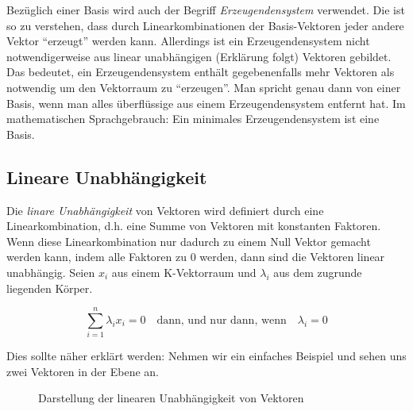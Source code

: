 Bezüglich einer Basis wird auch der Begriff \emph{Erzeugendensystem} verwendet. Die ist so zu verstehen, dass durch Linearkombinationen der Basis-Vektoren jeder andere Vektor "`erzeugt"' werden kann. Allerdings ist ein Erzeugendensystem nicht notwendigerweise aus linear unabhängigen (Erklärung folgt) Vektoren gebildet. Das bedeutet, ein Erzeugendensystem enthält gegebenenfalls mehr Vektoren als notwendig um den Vektorraum zu "`erzeugen"'. Man spricht genau dann von einer Basis, wenn man alles überflüssige aus einem Erzeugendensystem entfernt hat. Im mathematischen Sprachgebrauch: Ein minimales Erzeugendensystem ist eine Basis.

\subsection{Lineare Unabhängigkeit}

\begin{definition}
Die \emph{linare Unabhängigkeit}  von Vektoren wird definiert durch eine Linearkombination, d.h. eine Summe von Vektoren mit konstanten Faktoren. Wenn diese Linearkombination nur dadurch zu einem Null Vektor gemacht werden kann, indem alle Faktoren zu 0 werden, dann sind die Vektoren linear unabhängig. Seien $x_i$ aus einem K-Vektorraum und $\lambda_i $ aus dem zugrunde liegenden Körper. 

\begin{equation}\label{eq:linunabh}
\sum_{i=1}^{n} \lambda_i x_i = 0 \quad \text{dann, und nur dann, wenn} \quad \lambda_i = 0
\end{equation}
\end{definition}

Dies sollte näher erklärt werden: Nehmen wir ein einfaches Beispiel und sehen uns zwei Vektoren in der Ebene an. 

\bigskip

\begin{figure}
\begin{center}
\caption[Lineare Unabhängigkeit von Vektoren]{Darstellung der linearen Unabhängigkeit von Vektoren}
\end{center}
\end{figure}

